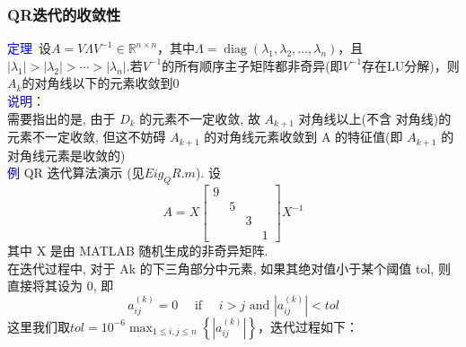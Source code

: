 \documentclass[12pt,a4paper]{article}
\begin{document}
\subsubsection{QR迭代的收敛性}
\textcolor{blue}{定理}~设$A=V \Lambda V^{-1} \in \mathbb{R}^{n \times n}$，其中$\Lambda=\operatorname{diag}\left(\lambda_{1}, \lambda_{2}, \ldots, \lambda_{n}\right)$，且$\left|\lambda_{1}\right|>\left|\lambda_{2}\right|>\cdots>\left|\lambda_{n}\right|$.若$V^{-1}$的所有顺序主子矩阵都非奇异(即$V^{-1}$存在LU分解)，则$A_{k}$的对角线以下的元素收敛到0\\
\textcolor{blue}{说明}：\\
需要指出的是, 由于 $D_{k}$ 的元素不一定收敛, 故 $A_{k+1}$ 对角线以上(不含 对角线)的元素不一定收敛, 但这不妨碍 $A_{k+1}$ 的对角线元素收敛到 A 的特征值(即 $A_{k+1}$ 的对角线元素是收敛的)\\
\textcolor{blue}{例} QR 迭代算法演示 (见$Eig_QR.m$). 设
$$
A=X\left[\begin{array}{cccc}
{9}&&& \\ 
&{5}&& \\
&&3& \\ 
&&&{1}
\end{array}\right] X^{-1}
$$
其中 X 是由 MATLAB 随机生成的非奇异矩阵.\\
在迭代过程中, 对于 Ak 的下三角部分中元素, 如果其绝对值小于某个阈值 tol, 则直接将其设为 0, 即
$$
a_{i j}^{(k)}=0 \quad \text { if } \quad i>j \text { and }\left|a_{i j}^{(k)}\right|<t o l
$$
这里我们取$t o l=10^{-6} \max _{1 \leq i, j \leq n}\left\{\left|a_{i j}^{(k)}\right|\right\}$，迭代过程如下：
\end{document}
